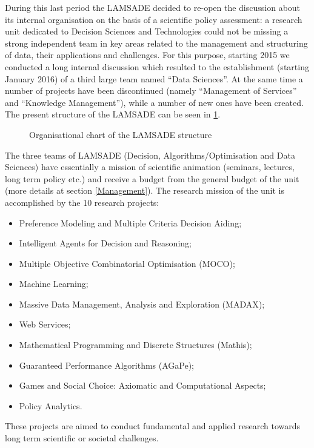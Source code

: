 During this last period the LAMSADE decided to re-open the discussion about its internal organisation on the basis of a scientific policy assessment: a research unit dedicated to Decision Sciences and Technologies could not be missing a strong independent team in key areas related to the management and structuring of data, their applications and challenges. For this purpose, starting 2015 we conducted a long internal discussion which resulted to the establishment (starting January 2016) of a third large team named ``Data Sciences''. At the same time a number of projects have been discontinued (namely ``Management of Services'' and ``Knowledge Management''), while a number of new ones have been created. The present structure of the LAMSADE can be seen in \cref{organisation-en}.


\begin{figure}
	\centering
	
	\caption{Organisational chart of the LAMSADE structure}\label{organisation-en}
\end{figure}

The three teams of LAMSADE (Decision, Algorithms/Optimisation and Data Sciences) have essentially a mission of scientific animation (seminars, lectures, long term policy etc.) and receive a budget from the general budget of the unit (more details at section \ref{Management}). The research mission of the unit is accomplished by the 10 research projects:
\begin{itemize}
\item Preference Modeling and Multiple Criteria Decision Aiding;
\item Intelligent Agents for Decision and Reasoning;
\item Multiple Objective Combinatorial Optimisation (MOCO);
\item Machine Learning;
\item Massive Data Management, Analysis and Exploration (MADAX);
\item Web Services;
\item Mathematical Programming and Discrete Structures (Mathis);
\item Guaranteed Performance Algorithms (AGaPe);
\item Games and Social Choice: Axiomatic and Computational Aspects;
\item Policy Analytics.
\end{itemize}
These projects are aimed to conduct fundamental and applied research towards long term scientific or societal challenges.


